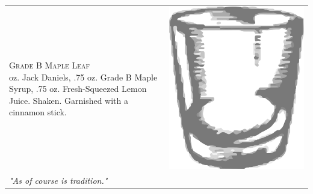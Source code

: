 \documentclass{article}
\begin{document}
\begin{tabular}{*{2}{m{}}}
{\raggedleft\huge\textsc{Grade B Maple Leaf}\\*}
\raggedleft 2 oz. Jack Daniels, .75 oz. Grade B Maple Syrup, .75 oz. Fresh-Squeezed Lemon Juice. Shaken.  Garnished with a cinnamon stick. & \includegraphics{rocks_glass.png}\\
\raggedleft\small\textit{"As of course is tradition."}
\end{tabular}
\end{document}
